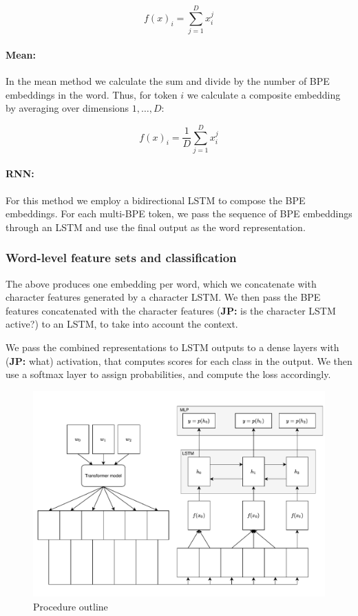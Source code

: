 \documentclass[11pt]{article}
\newcommand\jp[1]{(\textbf{JP:} #1)}
\begin{document}
	\begin{equation}
	f(x)_i = \sum_{j=1}^{D} x_i^j
	\end{equation}
	

    	\paragraph{Mean:} In the mean method we calculate the sum and
     divide by the number of BPE embeddings in the word. Thus, for
     token $i$ we calculate a composite embedding by averaging over
     dimensions $1,\ldots,D$:
	
	\begin{equation}
	f(x)_{i} = \frac{1}{D}\sum_{j=1}^{D} x_i^j
	\end{equation}
	
	
	\paragraph{RNN:} For this method we employ a bidirectional LSTM
        to compose the BPE embeddings. For each multi-BPE
        token, we pass the sequence of BPE embeddings through an LSTM
        and use the final output as the word representation. 
        
        \subsubsection{Word-level feature sets and classification}
        The above produces one embedding per word, which we
        concatenate with character features generated by a character
        LSTM. 
        We then pass the BPE features concatenated with the character
        features \jp{is the character LSTM active?} to an LSTM, to take
        into account the context.

        We pass the combined representations to LSTM outputs to a
        dense layers with \jp{what} activation, that computes scores
        for each class in the output. We then use a softmax layer to
        assign probabilities, and compute the loss accordingly.

	\begin{figure}%
		\centering
		\includegraphics[scale=0.5]{model-outline.pdf}
		\caption{\label{fig:model} Procedure outline}
	\end{figure}
\end{document}
